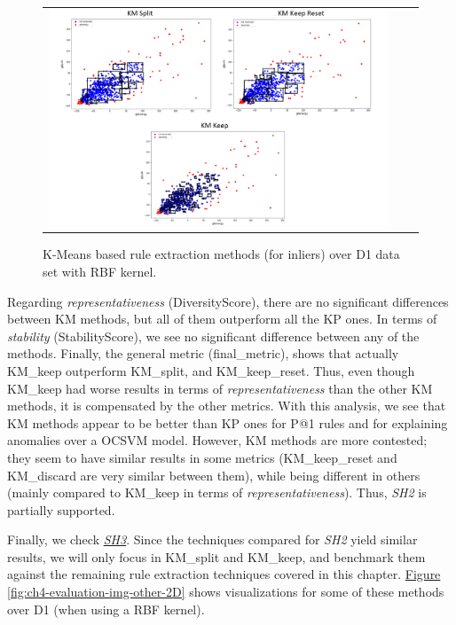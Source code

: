 \begin{figure}[h!]
\centering
  \begin{tabular}{c@{\qquad}c@{\qquad}c}
\includegraphics[width=0.9 \columnwidth]{figures/chapter4_RuleExtraction/clusteringMethods_comparison.PNG}
  \end{tabular} 
  \caption{K-Means based rule extraction methods (for inliers) over D1 data set with RBF kernel. \label{fig:ch4-evaluation-img-clustering-2D}}
\end{figure}

Regarding \textit{representativeness} (DiversityScore), there are no significant differences between KM methods, but all of them outperform all the KP ones. In terms of \textit{stability} (StabilityScore), we see no significant difference between any of the methods.
Finally, the general metric (final\_metric), shows that actually KM\_keep outperform KM\_split, and KM\_keep\_reset. Thus, even though KM\_keep had worse results in terms of \textit{representativeness} than the other KM methods, it is compensated by the other metrics.
With this analysis, we see that KM methods appear to be better than KP ones for P@1 rules and for explaining anomalies over a OCSVM model. However, KM methods are more contested; they seem to have similar results in some metrics (KM\_keep\_reset and KM\_discard are very similar between them), while being different in others (mainly compared to KM\_keep in terms of \textit{representativeness}). Thus, \textit{SH2} is partially supported. 

Finally, we check \textit{\hyperref[subhypothesis:subhypothesis4_3]{SH3}}. Since the techniques compared for \textit{SH2} yield similar results, we will only focus in KM\_split and KM\_keep, and benchmark them against the remaining rule extraction techniques covered in this chapter. \hyperref[fig:ch4-evaluation-img-other-2D]{Figure} \ref{fig:ch4-evaluation-img-other-2D} shows visualizations for some of these methods over D1 (when using a RBF kernel).

